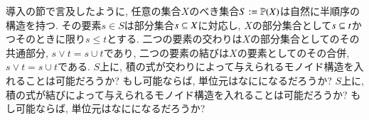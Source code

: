 \begin{exercise}
導入の節で言及したように, 任意の集合$X$のべき集合$S:=\PP(X)$は自然に半順序の構造を持つ. その要素$s\in S$は部分集合$s\ss X$に対応し, $X$の部分集合として$s\ss t$かつそのときに限り$s\leq t$とする. 二つの要素の交わりは$X$の部分集合としてのその共通部分, $s\vee t=s\cup t$であり, 二つの要素の結びは$X$の要素としてのその合併, $s\vee t=s\cup t$である.
\sexc $S$上に, 積の式が交わりによって与えられるモノイド構造を入れることは可能だろうか? もし可能ならば, 単位元はなにになるだろうか?
\next $S$上に, 積の式が結びによって与えられるモノイド構造を入れることは可能だろうか? もし可能ならば, 単位元はなにになるだろうか?
\endsexc
\end{exercise}

